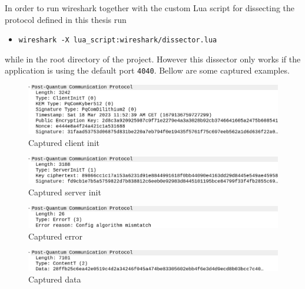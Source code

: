 In order to run wireshark together with the custom Lua script for dissecting the protocol defined in this thesis run
\begin{itemize}
  \item \texttt{wireshark -X lua\_script:wireshark/dissector.lua}
\end{itemize}
while in the root directory of the project. However this dissector only works if the application is using the default port \texttt{4040}. Bellow are some captured examples.
\begin{figure}[ht!]
  \centering
  \includegraphics[width=\textwidth]{pictures/clientinit.png}
  \caption{Captured client init}
  \label{img:cap_clientinit}
\end{figure}

\begin{figure}[ht!]
  \centering
  \includegraphics[width=\textwidth]{pictures/serverinit.png}
  \caption{Captured server init}
  \label{img:cap_serverinit}
\end{figure}

\begin{figure}[ht!]
  \centering
  \includegraphics[width=\textwidth]{pictures/error.png}
  \caption{Captured error}
  \label{img:cap_error}
\end{figure}

\begin{figure}[ht!]
  \centering
  \includegraphics[width=\textwidth]{pictures/data.png}
  \caption{Captured data}
  \label{img:cap_data}
\end{figure}
